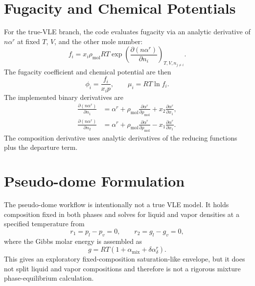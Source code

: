 \documentclass[11pt]{article}
\begin{document}
\section{Fugacity and Chemical Potentials}
For the true-VLE branch, the code evaluates fugacity via an analytic derivative of $n\alpha^r$ at fixed $T$, $V$, and the other mole number:
\begin{equation}
f_i = x_i \rho_{\mathrm{mol}} R T
\exp\!\left(\frac{\partial (n\alpha^r)}{\partial n_i}\right)_{T,V,n_{j \ne i}}.
\end{equation}
The fugacity coefficient and chemical potential are then
\begin{equation}
\phi_i = \frac{f_i}{x_i p},
\qquad
\mu_i = RT \ln f_i.
\end{equation}
The implemented binary derivatives are
\begin{align}
\frac{\partial (n\alpha^r)}{\partial n_1}
&=
\alpha^r
+ \rho_{\mathrm{mol}}\frac{\partial \alpha^r}{\partial \rho_{\mathrm{mol}}}
+ x_2 \frac{\partial \alpha^r}{\partial x_1}, \\
\frac{\partial (n\alpha^r)}{\partial n_2}
&=
\alpha^r
+ \rho_{\mathrm{mol}}\frac{\partial \alpha^r}{\partial \rho_{\mathrm{mol}}}
- x_1 \frac{\partial \alpha^r}{\partial x_1}.
\end{align}
The composition derivative uses analytic derivatives of the reducing functions plus the departure term.

\section{Pseudo-dome Formulation}
The pseudo-dome workflow is intentionally not a true VLE model. It holds composition fixed in both phases and solves for liquid and vapor densities at a specified temperature from
\begin{equation}
r_1 = p_l - p_v = 0,
\qquad
r_2 = g_l - g_v = 0,
\end{equation}
where the Gibbs molar energy is assembled as
\begin{equation}
g = RT \left( 1 + \alpha_{\mathrm{mix}} + \delta \alpha_{\delta}^r \right).
\end{equation}
This gives an exploratory fixed-composition saturation-like envelope, but it does not split liquid and vapor compositions and therefore is not a rigorous mixture phase-equilibrium calculation.
\end{document}
